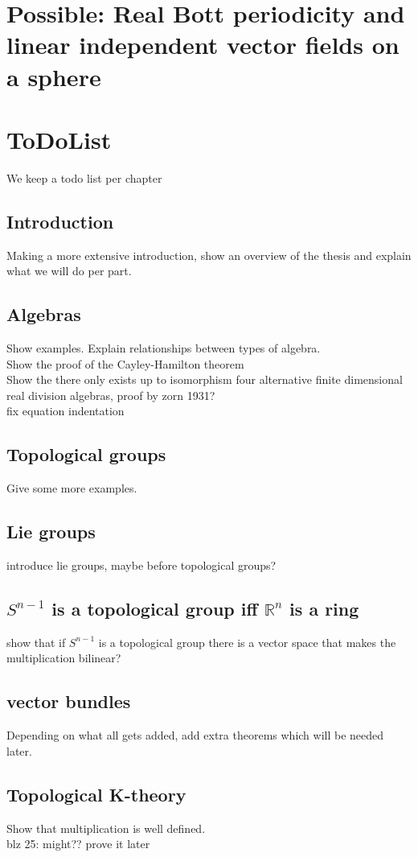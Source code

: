 \documentclass{report}
\begin{document}
\chapter{Possible: Real Bott periodicity and linear independent vector fields on a sphere}
\chapter{ToDoList}
We keep a todo list per chapter
\section{Introduction}
Making a more extensive introduction, show an overview of the thesis and explain what we will do per part.
\section{Algebras}
Show examples. Explain relationships between types of algebra.
\\Show the proof of the Cayley-Hamilton theorem
\\Show the there only exists up to isomorphism four alternative finite dimensional real division algebras, proof by zorn 1931?
\\fix equation indentation
\section{Topological groups}
Give some more examples.
\section{Lie groups}
introduce lie groups, maybe before topological groups?
\section{$S^ {n-1}$ is a topological group iff $\mathbb{R}^n$ is a ring}
show that if $S^{n-1}$ is a topological group there is a vector space that makes the multiplication bilinear?
\section{vector bundles}
Depending on what all gets added, add extra theorems which will be needed later.
\section{Topological K-theory}
Show that multiplication is well defined.
\\blz 25: might?? prove it later
\end{document}
